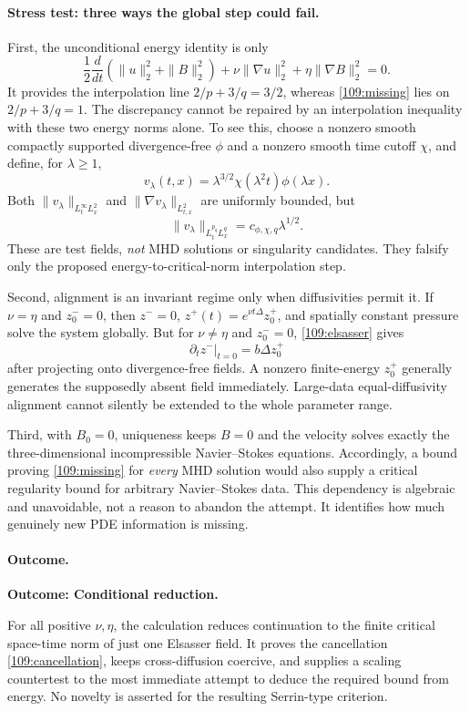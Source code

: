 \documentclass[11pt,a4paper]{article}
\numberwithin{equation}{section}
\begin{document}
\paragraph{Stress test: three ways the global step could fail.}
First, the unconditional energy identity is only
\[
 \frac12\frac d{dt}(\|u\|_2^2+\|B\|_2^2)
 +\nu\|\nabla u\|_2^2+\eta\|\nabla B\|_2^2=0.
\]
It provides the interpolation line $2/p+3/q=3/2$, whereas
\eqref{109:missing} lies on $2/p+3/q=1$.
The discrepancy cannot be repaired by an interpolation inequality with
these two energy norms alone. To see this, choose a nonzero smooth compactly
supported divergence-free $\phi$ and a nonzero smooth time cutoff $\chi$,
and define, for $\lambda\geq1$,
\[
 v_\lambda(t,x)=\lambda^{3/2}\chi(\lambda^2t)\phi(\lambda x).
\]
Both $\|v_\lambda\|_{L^\infty_tL^2_x}$ and
$\|\nabla v_\lambda\|_{L^2_{t,x}}$ are uniformly bounded, but
\[
 \|v_\lambda\|_{L^{p_q}_tL^q_x}
 =c_{\phi,\chi,q}\lambda^{1/2}.
\]
These are test fields, \emph{not} MHD solutions or singularity candidates.
They falsify only the proposed energy-to-critical-norm interpolation step.

Second, alignment is an invariant regime only when diffusivities permit it.
If $\nu=\eta$ and $z^-_0=0$, then
$z^-=0$, $z^+(t)=e^{\nu t\Delta}z^+_0$, and spatially constant pressure
solve the system globally. But for $\nu\ne\eta$ and $z^-_0=0$,
\eqref{109:elsasser} gives
\[
 \partial_tz^-\big|_{t=0}=b\Delta z^+_0
\]
after projecting onto divergence-free fields. A nonzero finite-energy
$z^+_0$ generally generates the supposedly absent field immediately.
Large-data equal-diffusivity alignment cannot silently be extended to the
whole parameter range.

Third, with $B_0=0$, uniqueness keeps $B=0$ and the velocity solves exactly
the three-dimensional incompressible Navier--Stokes equations. Accordingly,
a bound proving \eqref{109:missing} for \emph{every} MHD solution would also
supply a critical regularity bound for arbitrary Navier--Stokes data.
This dependency is algebraic and unavoidable, not a reason to abandon the
attempt. It identifies how much genuinely new PDE information is missing.

\paragraph{Outcome.}
\textbf{Outcome: Conditional reduction.}

For all positive $\nu,\eta$, the calculation reduces continuation to the
finite critical space-time norm of just one Elsasser field. It proves the
cancellation \eqref{109:cancellation}, keeps cross-diffusion coercive,
and supplies a scaling countertest to the most immediate attempt to deduce
the required bound from energy. No novelty is asserted for the resulting
Serrin-type criterion.
\end{document}
